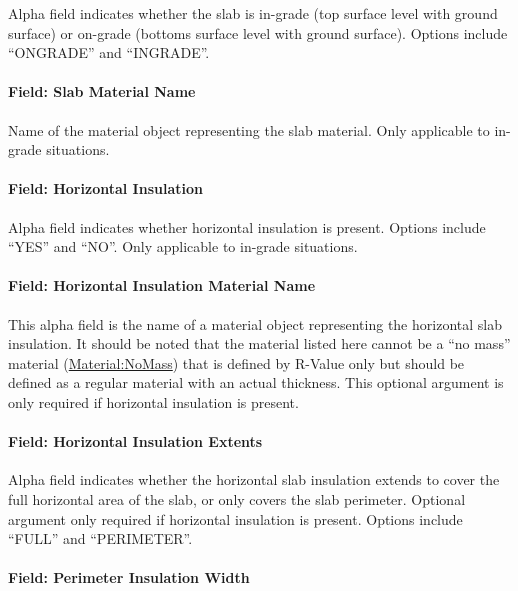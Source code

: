 Alpha field indicates whether the slab is in-grade (top surface level with ground surface) or on-grade (bottoms surface level with ground surface). Options include ``ONGRADE'' and ``INGRADE''.

\paragraph{Field: Slab Material Name}\label{field-slab-material-name}

Name of the material object representing the slab material. Only applicable to in-grade situations.

\paragraph{Field: Horizontal Insulation}\label{field-horizontal-insulation}

Alpha field indicates whether horizontal insulation is present. Options include ``YES'' and ``NO''. Only applicable to in-grade situations.

\paragraph{Field: Horizontal Insulation Material Name}\label{field-horizontal-insulation-material-name}

This alpha field is the name of a material object representing the horizontal slab insulation. It should be noted that the material listed here cannot be a ``no mass'' material (\hyperref[materialnomass]{Material:NoMass}) that is defined by R-Value only but should be defined as a regular material with an actual thickness. This optional argument is only required if horizontal insulation is present.

\paragraph{Field: Horizontal Insulation Extents}\label{field-horizontal-insulation-extents}

Alpha field indicates whether the horizontal slab insulation extends to cover the full horizontal area of the slab, or only covers the slab perimeter. Optional argument only required if horizontal insulation is present. Options include ``FULL'' and ``PERIMETER''.

\paragraph{Field: Perimeter Insulation Width}\label{field-perimeter-insulation-width}

